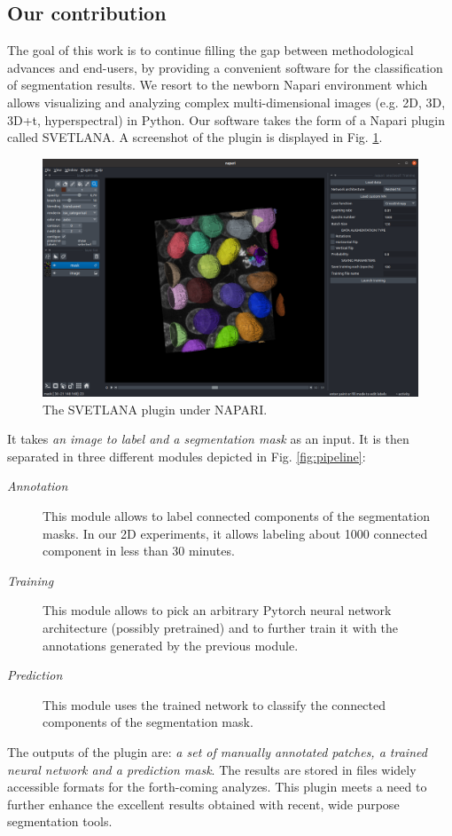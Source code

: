\documentclass{article}
\begin{document}
\subsection{Our contribution}

The goal of this work is to continue filling the gap between methodological advances and end-users, by providing a convenient software for the classification of segmentation results. 
We resort to the newborn Napari environment \cite{perkel2021python} which allows visualizing and analyzing complex multi-dimensional images (e.g. 2D, 3D, 3D+t, hyperspectral) in Python.
Our software takes the form of a Napari plugin called SVETLANA. A screenshot of the plugin is displayed in Fig. \ref{fig:interface}.

\begin{figure}[htp!]
 \centering
 \includegraphics[width=\linewidth]{Figures/interface.png}
  \caption{The SVETLANA plugin under NAPARI. \label{fig:interface}}
\end{figure}

It takes \emph{an image to label and a segmentation mask} as an input. It is then separated in three different modules depicted in Fig. \ref{fig:pipeline}: 
\begin{description}
  \item[\emph{Annotation}] This module allows to label connected components of the segmentation masks. In our 2D experiments, it allows labeling about 1000 connected component in less than 30 minutes.
  \item[\emph{Training}] This module allows to pick an arbitrary Pytorch \cite{paszke2019pytorch} neural network architecture (possibly pretrained) and to further train it with the annotations generated by the previous module.
  \item[\emph{Prediction}] This module uses the trained network to classify the connected components of the segmentation mask.
\end{description}
The outputs of the plugin are: \emph{a set of manually annotated patches, a trained neural network and a prediction mask}. 
The results are stored in files widely accessible formats for the forth-coming analyzes. This plugin meets a need to further enhance the excellent results obtained with recent, wide purpose segmentation tools. 
\end{document}

